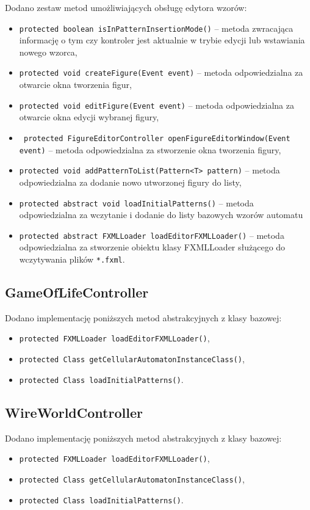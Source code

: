 \documentclass{mwart}
\begin{document}
Dodano zestaw metod umożliwiających obsługę edytora wzorów:
\begin{itemize}
	\item \texttt{protected boolean isInPatternInsertionMode()} -- metoda zwracająca informację o tym czy kontroler jest aktualnie w trybie edycji lub wstawiania nowego wzorca,
	\item \texttt{protected void createFigure(Event event)} -- metoda odpowiedzialna za otwarcie okna tworzenia figur,
	\item \texttt{protected void editFigure(Event event)} -- metoda odpowiedzialna za otwarcie okna edycji wybranej figury,
	\item \texttt{ protected FigureEditorController openFigureEditorWindow(Event event)} -- metoda odpowiedzialna za stworzenie okna tworzenia figury,
	\item \texttt{protected void addPatternToList(Pattern<T> pattern)} -- metoda odpowiedzialna za dodanie nowo utworzonej figury do listy,
	\item \texttt{protected abstract void loadInitialPatterns()} -- metoda odpowiedzialna za wczytanie i dodanie do listy bazowych wzorów automatu
	\item \texttt{protected abstract FXMLLoader loadEditorFXMLLoader()} -- metoda odpowiedzialna za stworzenie obiektu klasy FXMLLoader służącego do wczytywania plików \texttt{*.fxml}.
\end{itemize}

\subsection{GameOfLifeController}
Dodano implementację poniższych metod abstrakcyjnych z klasy bazowej:
\begin{itemize}
	\item \texttt{protected FXMLLoader loadEditorFXMLLoader()},
	\item \texttt{protected Class getCellularAutomatonInstanceClass()},
	\item \texttt{protected Class loadInitialPatterns()}.
\end{itemize}

\subsection{WireWorldController}
Dodano implementację poniższych metod abstrakcyjnych z klasy bazowej:
\begin{itemize}
	\item \texttt{protected FXMLLoader loadEditorFXMLLoader()},
	\item \texttt{protected Class getCellularAutomatonInstanceClass()},
	\item \texttt{protected Class loadInitialPatterns()}.
\end{itemize}
\end{document}
